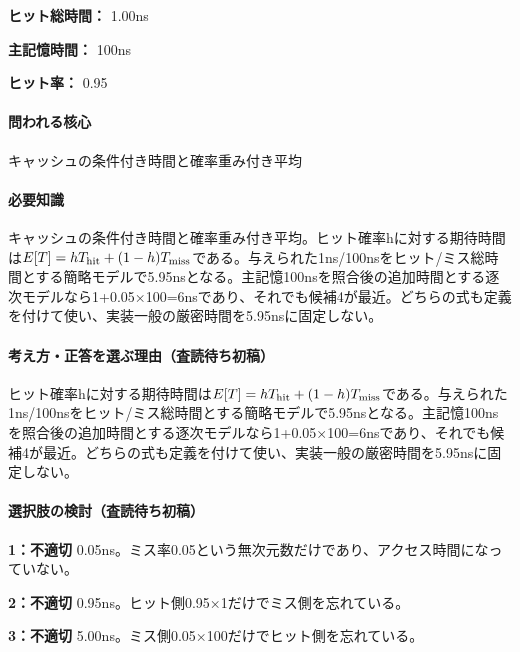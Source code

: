 \noindent\textbf{ヒット総時間：} 1.00ns\par

\noindent\textbf{主記憶時間：} 100ns\par

\noindent\textbf{ヒット率：} 0.95\par

\paragraph{問われる核心} キャッシュの条件付き時間と確率重み付き平均

\paragraph{必要知識} キャッシュの条件付き時間と確率重み付き平均。ヒット確率hに対する期待時間は\(E[T]=hT_{\rm hit}+(1-h)T_{\rm miss}\)である。与えられた1ns/100nsをヒット/ミス総時間とする簡略モデルで5.95nsとなる。主記憶100nsを照合後の追加時間とする逐次モデルなら1+0.05×100=\allowbreak{}6nsであり、それでも候補4が最近。どちらの式も定義を付けて使い、実装一般の厳密時間を5.95nsに固定しない。

\paragraph{考え方・正答を選ぶ理由（査読待ち初稿）} ヒット確率hに対する期待時間は\(E[T]=hT_{\rm hit}+(1-h)T_{\rm miss}\)である。与えられた1ns/100nsをヒット/ミス総時間とする簡略モデルで5.95nsとなる。主記憶100nsを照合後の追加時間とする逐次モデルなら1+0.05×100=\allowbreak{}6nsであり、それでも候補4が最近。どちらの式も定義を付けて使い、実装一般の厳密時間を5.95nsに固定しない。

\paragraph{選択肢の検討（査読待ち初稿）}\mbox{}\par

\noindent\textbf{1：不適切} 0.05ns。ミス率0.05という無次元数だけであり、アクセス時間になっていない。\par

\noindent\textbf{2：不適切} 0.95ns。ヒット側0.95×1だけでミス側を忘れている。\par

\noindent\textbf{3：不適切} 5.00ns。ミス側0.05×100だけでヒット側を忘れている。\par

